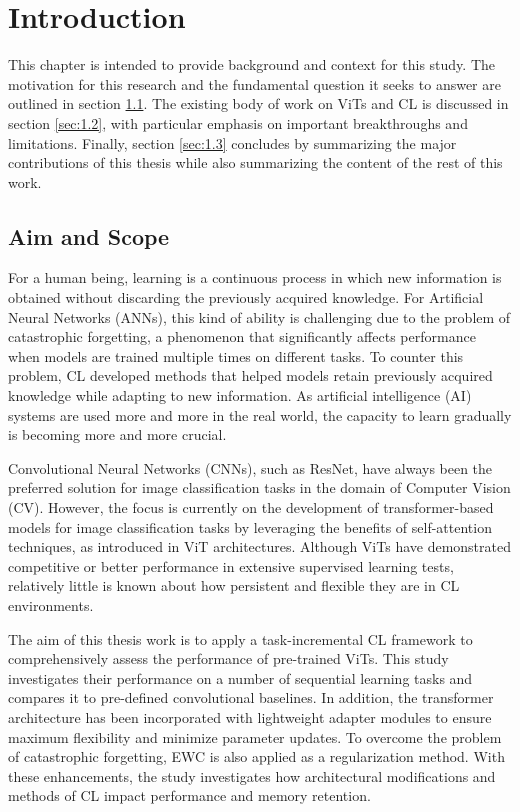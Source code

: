 \documentclass[english, LaM, oneside]{sapthesis}%
\numberwithin{equation}{chapter}
\begin{document}
\tableofcontents

\mainmatter
\chapter{Introduction}
 This chapter is intended to provide background and context for this study. The motivation for this research and the fundamental question it seeks to answer are outlined in section \ref{sec:1.1}. The existing body of work on ViTs and CL is discussed in section \ref{sec:1.2}, with particular emphasis on important breakthroughs and limitations. Finally, section \ref{sec:1.3} concludes by summarizing the major contributions of this thesis while also summarizing the content of the rest of this work.
\section{Aim and Scope}
\label{sec:1.1}
For a human being, learning is a continuous process in which new information is obtained without discarding the previously acquired knowledge. For Artificial Neural Networks (ANNs), this kind of ability is challenging due to the problem of catastrophic forgetting, a phenomenon that significantly affects performance when models are trained multiple times on different tasks\cite{1}\cite{2}. To counter this problem, CL developed methods that helped models retain previously acquired knowledge while adapting to new information. As artificial intelligence (AI) systems are used more and more in the real world, the capacity to learn gradually is becoming more and more crucial.

Convolutional Neural Networks (CNNs), such as ResNet, have always been the preferred solution for image classification tasks in the domain of Computer Vision (CV)\cite{3}. However, the focus is currently on the development of transformer-based models for image classification tasks by leveraging the benefits of self-attention techniques, as introduced in ViT architectures\cite{4}. Although ViTs have demonstrated competitive or better performance in extensive supervised learning tests, relatively little is known about how persistent and flexible they are in CL environments\cite{5}.

The aim of this thesis work is to apply a task-incremental CL framework to comprehensively assess the performance of pre-trained ViTs. This study investigates their performance on a number of sequential learning tasks and compares it to pre-defined convolutional baselines. In addition, the transformer architecture has been incorporated with lightweight adapter modules to ensure maximum flexibility and minimize parameter updates. To overcome the problem of catastrophic forgetting, EWC is also applied as a regularization method. With these enhancements, the study investigates how architectural modifications and methods of CL impact performance and memory retention.
\end{document}
